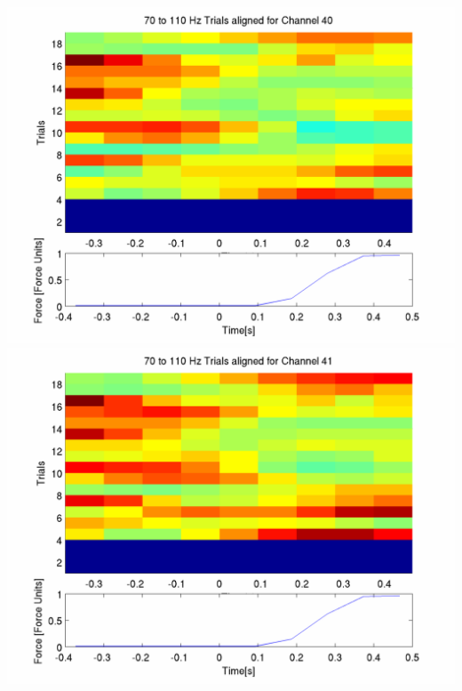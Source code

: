 \documentclass[12pt]{article}
\begin{document}
\includegraphics[scale=0.2]{plot_3_aligned_trials.png}
\includegraphics[scale=0.2]{plot_4_aligned_trials.png}
\end{document}
